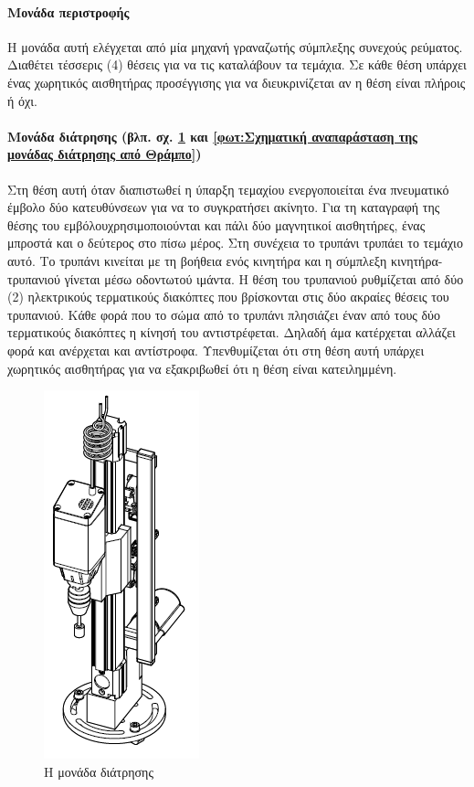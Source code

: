 \documentclass[a4paper,12pt,twoside]{report}
\begin{document}
				\paragraph{Μονάδα περιστροφής} {Η μονάδα αυτή ελέγχεται από μία \gls{μηχανή γραναζωτής σύμπλεξης συνεχούς ρεύματος}. Διαθέτει τέσσερις (4) θέσεις για να τις καταλάβουν τα τεμάχια. Σε κάθε θέση υπάρχει ένας χωρητικός αισθητήρας προσέγγισης για να διευκρινίζεται αν η θέση είναι πλήροις ή όχι.
				}
				
				\paragraph{Μονάδα διάτρησης {\footnotesize (βλπ. σχ. \ref{φωτ:Η μονάδα διάτρησης από Festo} και \ref{φωτ:Σχηματική αναπαράσταση της μονάδας διάτρησης από Θράμπο})}} {Στη θέση αυτή όταν διαπιστωθεί η ύπαρξη τεμαχίου ενεργοποιείται ένα πνευματικό έμβολο δύο κατευθύνσεων για να το συγκρατήσει ακίνητο. Για τη καταγραφή της θέσης του εμβόλουχρησιμοποιούνται και πάλι δύο μαγνητικοί αισθητήρες, ένας μπροστά και ο δεύτερος στο πίσω μέρος. Στη συνέχεια το τρυπάνι τρυπάει το τεμάχιο αυτό. Το τρυπάνι κινείται με τη βοήθεια ενός κινητήρα και η σύμπλεξη κινητήρα-τρυπανιού γίνεται μέσω οδοντωτού ιμάντα. Η θέση του τρυπανιού ρυθμίζεται από δύο (2) ηλεκτρικούς τερματικούς διακόπτες που βρίσκονται στις δύο ακραίες θέσεις του τρυπανιού. Κάθε φορά που το σώμα από το τρυπάνι πλησιάζει έναν από τους δύο τερματικούς διακόπτες η κίνησή του αντιστρέφεται. Δηλαδή άμα κατέρχεται αλλάζει φορά και ανέρχεται και αντίστροφα. Υπενθυμίζεται ότι στη θέση αυτή υπάρχει χωρητικός αισθητήρας για να εξακριβωθεί ότι η θέση είναι κατειλημμένη.
				}
				\begin{figure}[hp]
					\centering
					\includegraphics[scale=1]{ProcessingStationDrillingModuleFesto.png}
					\caption{Η μονάδα διάτρησης \cite{FestoMPSProcessingStationManual}}
					\label{φωτ:Η μονάδα διάτρησης από Festo}
				\end{figure}
				
\end{document}

